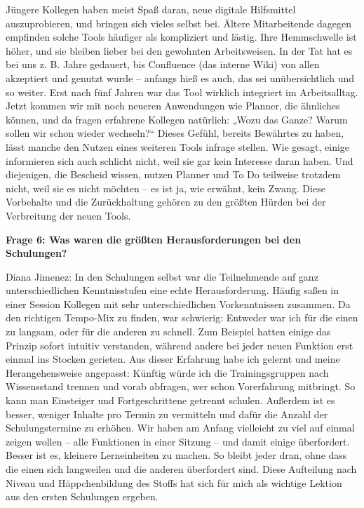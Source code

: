 \documentclass[
    12pt, 
    a4paper,
    ]{scrartcl} %
\begin{document}
Jüngere Kollegen haben meist Spaß daran, neue digitale Hilfsmittel auszuprobieren, und bringen sich vieles selbst bei. Ältere Mitarbeitende dagegen empfinden solche Tools häufiger als kompliziert und lästig. Ihre Hemmschwelle ist höher, und sie bleiben lieber bei den gewohnten Arbeitsweisen. In der Tat hat es bei uns z. B. Jahre gedauert, bis Confluence (das interne Wiki) von allen akzeptiert und genutzt wurde – anfangs hieß es auch, das sei unübersichtlich und so weiter. Erst nach fünf Jahren war das Tool wirklich integriert im Arbeitsalltag. Jetzt kommen wir mit noch neueren Anwendungen wie Planner, die ähnliches können, und da fragen erfahrene Kollegen natürlich: „Wozu das Ganze? Warum sollen wir schon wieder wechseln?“ Dieses Gefühl, bereits Bewährtes zu haben, lässt manche den Nutzen eines weiteren Tools infrage stellen. Wie gesagt, einige informieren sich auch schlicht nicht, weil sie gar kein Interesse daran haben. Und diejenigen, die Bescheid wissen, nutzen Planner und To Do teilweise trotzdem nicht, weil sie es nicht möchten – es ist ja, wie erwähnt, kein Zwang. Diese Vorbehalte und die Zurückhaltung gehören zu den größten Hürden bei der Verbreitung der neuen Tools.

\textbf{Frage 6: Was waren die größten Herausforderungen bei den Schulungen?}

Diana Jimenez: In den Schulungen selbst war die Teilnehmende auf ganz unterschiedlichen Kenntnisstufen eine echte Herausforderung. Häufig saßen in einer Session Kollegen mit sehr unterschiedlichen Vorkenntnissen zusammen. Da den richtigen Tempo-Mix zu finden, war schwierig: Entweder war ich für die einen zu langsam, oder für die anderen zu schnell. Zum Beispiel hatten einige das Prinzip sofort intuitiv verstanden, während andere bei jeder neuen Funktion erst einmal ins Stocken gerieten. Aus dieser Erfahrung habe ich gelernt und meine Herangehensweise angepasst: Künftig würde ich die Trainingsgruppen nach Wissensstand trennen und vorab abfragen, wer schon Vorerfahrung mitbringt. So kann man Einsteiger und Fortgeschrittene getrennt schulen. Außerdem ist es besser, weniger Inhalte pro Termin zu vermitteln und dafür die Anzahl der Schulungstermine zu erhöhen. Wir haben am Anfang vielleicht zu viel auf einmal zeigen wollen – alle Funktionen in einer Sitzung – und damit einige überfordert. Besser ist es, kleinere Lerneinheiten zu machen. So bleibt jeder dran, ohne dass die einen sich langweilen und die anderen überfordert sind. Diese Aufteilung nach Niveau und Häppchenbildung des Stoffs hat sich für mich als wichtige Lektion aus den ersten Schulungen ergeben.
\end{document}
